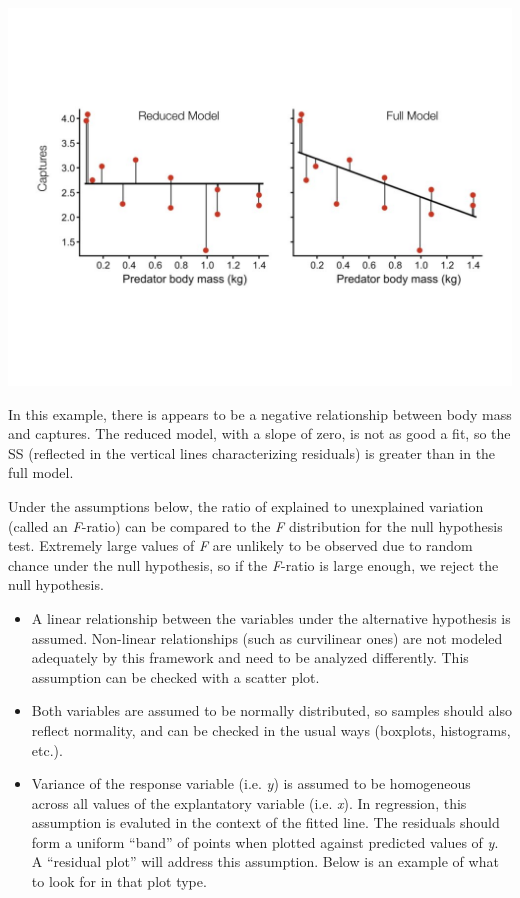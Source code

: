 \documentclass[]{book}
\begin{document}
\begin{center}\includegraphics[width=14.22in]{images/images_4b.011} \end{center}

In this example, there is appears to be a negative relationship between body mass and captures. The reduced model, with a slope of zero, is not as good a fit, so the SS (reflected in the vertical lines characterizing residuals) is greater than in the full model.

Under the assumptions below, the ratio of explained to unexplained variation (called an \emph{F}-ratio) can be compared to the \emph{F} distribution for the null hypothesis test. Extremely large values of \emph{F} are unlikely to be observed due to random chance under the null hypothesis, so if the \emph{F}-ratio is large enough, we reject the null hypothesis.

\begin{itemize}
\item
  A linear relationship between the variables under the alternative hypothesis is assumed. Non-linear relationships (such as curvilinear ones) are not modeled adequately by this framework and need to be analyzed differently. This assumption can be checked with a scatter plot.
\item
  Both variables are assumed to be normally distributed, so samples should also reflect normality, and can be checked in the usual ways (boxplots, histograms, etc.).
\item
  Variance of the response variable (i.e. \emph{y}) is assumed to be homogeneous across all values of the explantatory variable (i.e. \emph{x}). In regression, this assumption is evaluted in the context of the fitted line. The residuals should form a uniform ``band'' of points when plotted against predicted values of \emph{y}. A ``residual plot'' will address this assumption. Below is an example of what to look for in that plot type.
\end{itemize}
\end{document}
